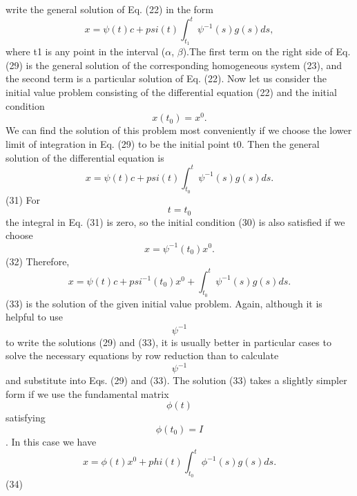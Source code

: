 \documentclass[onecolumn]{IEEEtran}
\begin{document}
write the general solution of Eq. (22) in the form
\begin{equation}
 x=\psi(t)c+psi(t)\int_{t_1}^{t}\psi^{-1}(s)g(s)ds,
\end{equation} 
where t1 is any point in the interval ($\alpha$, $\beta$).The first term on the right side of Eq. (29) is
the general solution of the corresponding homogeneous system (23), and the second
term is a particular solution of Eq. (22).
Now let us consider the initial value problem consisting of the differential equation
(22) and the initial condition
\begin{equation}
x(t_0)=x^{0}.
\end{equation} 
We can find the solution of this problem most conveniently if we choose the lower
limit of integration in Eq. (29) to be the initial point t0. Then the general solution of
the differential equation is
\begin{equation}
 x=\psi(t)c+psi(t)\int_{t_0}^{t}\psi^{-1}(s)g(s)ds.
\end{equation} (31)
For\begin{equation}
t=t_0
\end{equation}   the integral in Eq. (31) is zero, so the initial condition (30) is also satisfied
if we choose
\begin{equation}
 x=\psi^{-1}(t_0)x^{0}.
\end{equation} (32)
Therefore,
\begin{equation}
 x=\psi(t)c+psi^{-1}(t_0)x^{0}+\int_{t_0}^{t}\psi^{-1}(s)g(s)ds.
\end{equation}(33)
is the solution of the given initial value problem. Again, although it is helpful to use\begin{equation}
 \psi^{-1}
\end{equation}  to write the solutions (29) and (33), it is usually better in particular cases to solve
the necessary equations by row reduction than to calculate\begin{equation}
 \psi^{-1}
\end{equation} and substitute into
Eqs. (29) and (33).
The solution (33) takes a slightly simpler form if we use the fundamental matrix
\begin{equation}
 \phi(t)
\end{equation}satisfying \begin{equation}
 \phi(t_0)=I
\end{equation}. In this case we have
\begin{equation}
 x=\phi(t)x^{0}+phi(t)\int_{t_0}^{t}\phi^{-1}(s)g(s)ds.
\end{equation} (34)
\end{document}
